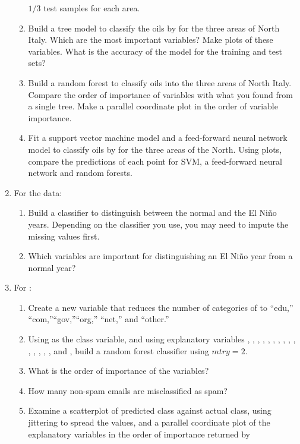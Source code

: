 \begin{enumerate}
\begin{enumerate}
$1/3$ test samples for each area.
\item Build a tree model to classify the oils by  for the
three areas of North Italy. Which are the most important
variables? Make plots of these variables. What is the accuracy of the
model for the training and test sets?
\item Build a random forest to classify oils into the three areas of
North Italy. Compare the order of importance of variables with what
you found from a single tree. Make a parallel coordinate plot in the
order of variable importance.
\item Fit a support vector machine model and a feed-forward neural
network model to classify oils by  for the three areas of
the North. Using plots, compare the predictions of each point for SVM,
a feed-forward neural network and random forests.
\end{enumerate}
\item For the  data:
\begin{enumerate}
\item Build a classifier to distinguish between the normal and the El
Ni\~{n}o years. Depending on the classifier you use, you may need to
impute the missing values first.
\item Which variables are important for distinguishing an El Ni\~no 
year from a normal year?
\end{enumerate}
\item For :
\begin{enumerate}
\item Create a new variable  that reduces the
number of categories of  to ``edu,''
``com,''``gov,''``org,'' ``net,'' and ``other.''
\item Using  as the class variable, and using explanatory
variables , , ,
, , , ,
, , , ,
, , , , and
, build a random forest classifier using $mtry=2$.
\item What is the order of importance of the variables?
\item How many non-spam emails are misclassified as spam?
\item Examine a scatterplot of predicted class against actual class,
using jittering to spread the values, and a parallel coordinate plot
of the explanatory variables in the order of importance returned by

\end{enumerate}
\end{enumerate}

